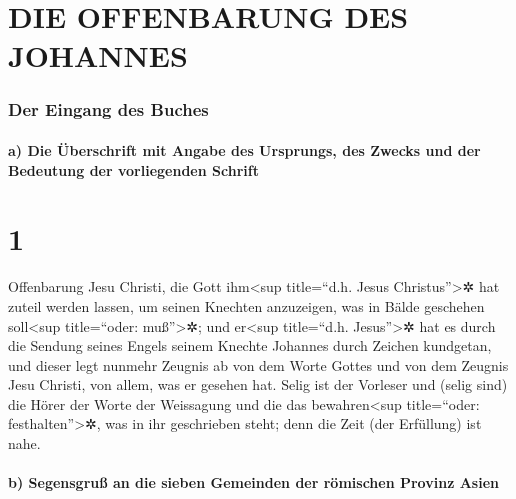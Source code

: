 \hypertarget{die-offenbarung-des-johannes}{%
\section{DIE OFFENBARUNG DES
JOHANNES}\label{die-offenbarung-des-johannes}}

\hypertarget{der-eingang-des-buches}{%
\subsubsection{Der Eingang des Buches}\label{der-eingang-des-buches}}

\hypertarget{a-die-uxfcberschrift-mit-angabe-des-ursprungs-des-zwecks-und-der-bedeutung-der-vorliegenden-schrift}{%
\paragraph{a) Die Überschrift mit Angabe des Ursprungs, des Zwecks und
der Bedeutung der vorliegenden
Schrift}\label{a-die-uxfcberschrift-mit-angabe-des-ursprungs-des-zwecks-und-der-bedeutung-der-vorliegenden-schrift}}

\hypertarget{section}{%
\section{1}\label{section}}

 Offenbarung Jesu Christi, die Gott ihm\textless sup
title=``d.h. Jesus Christus''\textgreater✲ hat zuteil werden lassen, um
seinen Knechten anzuzeigen, was in Bälde geschehen soll\textless sup
title=``oder: muß''\textgreater✲; und er\textless sup title=``d.h.
Jesus''\textgreater✲ hat es durch die Sendung seines Engels seinem
Knechte Johannes durch Zeichen kundgetan,  und dieser legt
nunmehr Zeugnis ab von dem Worte Gottes und von dem Zeugnis Jesu
Christi, von allem, was er gesehen hat.  Selig ist der
Vorleser und (selig sind) die Hörer der Worte der Weissagung und die das
bewahren\textless sup title=``oder: festhalten''\textgreater✲, was in
ihr geschrieben steht; denn die Zeit (der Erfüllung) ist nahe.

\hypertarget{b-segensgruuxdf-an-die-sieben-gemeinden-der-ruxf6mischen-provinz-asien}{%
\paragraph{b) Segensgruß an die sieben Gemeinden der römischen Provinz
Asien}\label{b-segensgruuxdf-an-die-sieben-gemeinden-der-ruxf6mischen-provinz-asien}}

